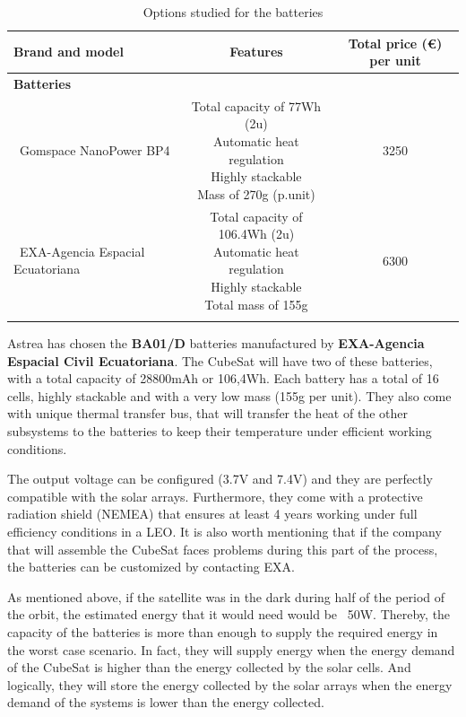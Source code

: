 \begin{longtable}{| l | c | c | }
\hline
\rowcolor[gray]{0.80}	\textbf{Brand and model} &  \textbf{Features}     & \textbf{Total price (\euro) per unit}   \\
\hline
\endfirsthead
\rowcolor[gray]{0.85} \textbf{Batteries} &  &  \\
	   ~Gomspace NanoPower BP4 & \makecell{Total capacity of 77Wh (2u) \\ Automatic heat regulation \\ Highly stackable \\ Mass of 270g (p.unit)} & 3250 \\
	\hline
	~EXA-Agencia Espacial Ecuatoriana & \makecell{Total capacity of 106.4Wh (2u)\\ Automatic heat regulation \\ Highly stackable \\ Total mass of 155g} & 6300 \\
	\hline
	
\caption{Options studied for the batteries}
\label{optionsbatteries}
\end{longtable}

Astrea has chosen the \textbf{BA01/D} batteries manufactured by \textbf{EXA-Agencia Espacial Civil Ecuatoriana}. The CubeSat will have two of these batteries, with a total capacity of 28800mAh or 106,4Wh. Each battery has a total of 16 cells, highly stackable and with a very low mass (155g per unit). They also come with unique thermal transfer bus, that will transfer the heat of the other subsystems to the batteries to keep their temperature under efficient working conditions.

The output voltage can be configured (3.7V and 7.4V) and they are perfectly compatible with the solar arrays. Furthermore, they come with a protective radiation shield (NEMEA) that ensures at least 4 years working under full efficiency conditions in a LEO. It is also worth mentioning that if the company that will assemble the CubeSat faces problems during this part of the process, the batteries can be customized by contacting EXA.

As mentioned above, if the satellite was in the dark during half of the period of the orbit, the estimated energy that it would need would be ~50W. Thereby, the capacity of the batteries is more than enough to supply the required energy in the worst case scenario. In fact, they will supply energy when the energy demand of the CubeSat is higher than the energy collected by the solar cells. And logically, they will store the energy collected by the solar arrays when the energy demand of the systems is lower than the energy collected.